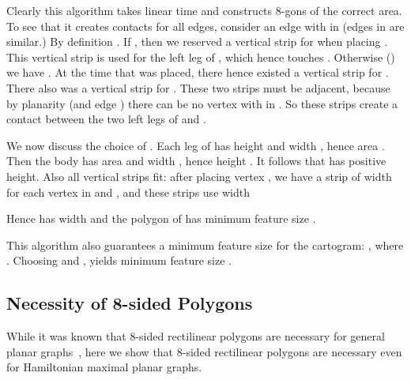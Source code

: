 \documentclass[11pt]{article}
\newenvironment{proof}{{\bf Proof:} }{\hspace*{\fill}\vspace{2mm}}
\begin{document}
\begin{proof}
Clearly this algorithm takes linear time and constructs 8-gons of the
correct area.  To see that it creates contacts for all edges, consider
an edge  with  in  (edges in  are similar.)
By definition .  If ,
then we reserved a vertical strip for  when placing .  This
vertical strip is used for the left leg of , which hence touches .
Otherwise ()
we have . At the time that  was placed, there
hence existed a vertical strip for .
There also was a vertical strip for .
These two strips must be adjacent, because
by planarity (and edge ) there can
be no vertex  with  in .
So these strips create a contact between the two left legs of  and .

We now discuss the choice of .
Each leg of  has height  and width , hence area
.  Then the body  has area 
and width , hence height .
It follows that  has positive height.  Also all vertical
strips fit:  after placing vertex , we have a strip of width 
for each vertex  in  and , and  these
strips use width

Hence  has width  and the polygon
of  has minimum feature size .
\end{proof}


This algorithm also guarantees a minimum feature
 size for the cartogram: , where . Choosing  and , yields minimum feature size .


\subsection{Necessity of 8-sided Polygons}
While it was known that 8-sided rectilinear polygons are necessary for
general planar graphs~\cite{Rin87}, here we show that 8-sided
rectilinear polygons are necessary even for Hamiltonian maximal planar
graphs.
\end{document}
